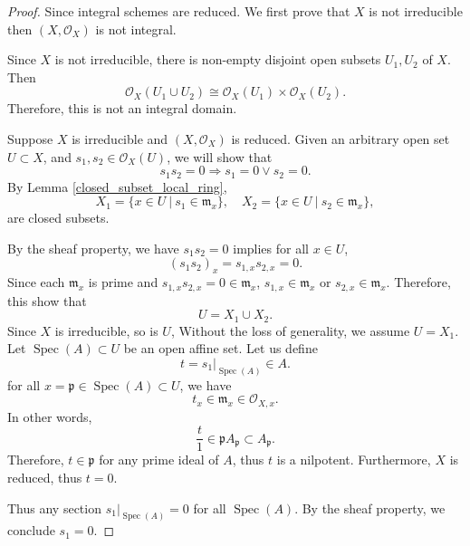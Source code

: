 \documentclass{article}
\numberwithin{equation}{section}
\DeclareMathOperator{\Spec}{Spec}
\begin{document}
\begin{proof}
Since integral schemes are reduced. We first prove that $X$ is not irreducible then $(X,\mathcal{O}_X)$ is not integral.\\
\par Since $X$ is not irreducible, there is non-empty disjoint open subsets $U_1,U_2$ of $X$. Then %
\begin{equation*}
\mathcal{O}_X(U_1\cup U_2) \cong\mathcal{O}_X(U_1)\times\mathcal{O}_X(U_2).
\end{equation*}
Therefore, this is not an integral domain. \\
\par Suppose $X$ is irreducible and $(X,\mathcal{O}_X)$ is reduced. Given an arbitrary open set $U\subset X$, and $s_1,s_2\in\mathcal{O}_X(U)$, we will show that
\begin{equation*}
s_1s_2=0\Rightarrow s_1=0\lor s_2=0.
\end{equation*}
By Lemma \ref{closed_subset_local_ring}, 
\begin{equation*}
X_1 = \{x\in U\:|\: s_1\in\mathfrak{m}_x\},\quad X_2 = \{x\in U\:|\: s_2\in\mathfrak{m}_x\},
\end{equation*}
are closed subsets.\\
\par By the sheaf property, we have $s_1s_2=0$ implies for all $x\in U$, 
\begin{equation*}
(s_1s_2)_x=s_{1,x}s_{2,x}=0.
\end{equation*}
Since each $\mathfrak{m}_x$ is prime and $s_{1,x}s_{2,x}=0\in\mathfrak{m}_x$, $s_{1,x}\in\mathfrak{m}_x$ or $s_{2,x}\in\mathfrak{m}_x$. Therefore, this show that 
\begin{equation*}
U = X_1\cup X_2.
\end{equation*}
Since $X$ is irreducible, so is $U$, %
Without the loss of generality, we assume $U=X_1$. Let $\Spec(A)\subset U$ be an open affine set. Let us define
\begin{equation*}
t= s_1|_{\Spec(A)}\in A.
\end{equation*}
for all $x=\mathfrak{p}\in\Spec(A)\subset U$, we have
\begin{equation*}
t_x\in\mathfrak{m}_x\in\mathcal{O}_{X,x}.
\end{equation*}
In other words,
\begin{equation*}
{\frac t 1}\in\mathfrak{p}A_\mathfrak{p}\subset A_\mathfrak{p}.
\end{equation*}
Therefore, $t\in\mathfrak{p}$ for any prime ideal of $A$, thus $t$ is a nilpotent. Furthermore, $X$ is reduced, thus $t=0$.\\
\par Thus any section $s_1|_{\Spec(A)}=0$ for all $\Spec(A)$. By the sheaf property, we conclude $s_1=0$. 
\end{proof}
\end{document}

